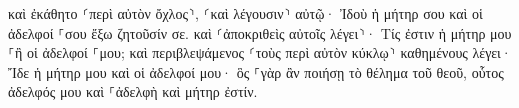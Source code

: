 \documentclass{openreader}
\begin{document}
καὶ ἐκάθητο ⸂περὶ αὐτὸν ὄχλος⸃, ⸂καὶ λέγουσιν⸃ αὐτῷ· Ἰδοὺ ἡ μήτηρ σου καὶ οἱ ἀδελφοί ⸀σου ἔξω ζητοῦσίν σε. 
καὶ ⸂ἀποκριθεὶς αὐτοῖς λέγει⸃· Τίς ἐστιν ἡ μήτηρ μου ⸀ἢ οἱ ἀδελφοί ⸀μου; 
καὶ περιβλεψάμενος ⸂τοὺς περὶ αὐτὸν κύκλῳ⸃ καθημένους λέγει· Ἴδε ἡ μήτηρ μου καὶ οἱ ἀδελφοί μου· 
ὃς ⸀γὰρ ἂν ποιήσῃ τὸ θέλημα τοῦ θεοῦ, οὗτος ἀδελφός μου καὶ ⸀ἀδελφὴ καὶ μήτηρ ἐστίν. 
\end{document}
